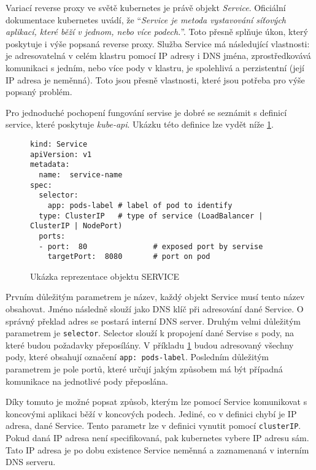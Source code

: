 Variací reverse proxy ve světě kubernetes je právě objekt \textit{Service}. Oficiální dokumentace kubernetes uvádí, že \enquote{\textit{Service je metoda vystavování síťových aplikací, které běží v jednom, nebo více podech.}}\cite{a2023_service}. Toto přesně splňuje úkon, který poskytuje i výše popsaná reverse proxy. Služba Service má následující vlastnosti: je adresovatelná v celém klastru pomocí IP adresy i DNS jména, zprostředkovává komunikaci s jedním, nebo více pody v klastru, je spolehlivá a perzistentní (její IP adresa je neměnná). Toto jsou přesně vlastnosti, které jsou potřeba pro výše popsaný problém.

Pro jednoduché pochopení fungování servise je dobré se seznámit s definicí service, které poskytuje \textit{kube-api}. Ukázku této definice lze vydět níže \ref{fig:def_service}.
\begin{figure}[!htbp]
\caption{Ukázka reprezentace objektu SERVICE}
\label{fig:def_service}
\begin{verbatim}
kind: Service
apiVersion: v1
metadata:
  name:  service-name
spec:
  selector:
    app: pods-label # label of pod to identify 
  type: ClusterIP   # type of service (LoadBalancer | ClusterIP | NodePort)
  ports:
  - port:  80               # exposed port by servise
    targetPort:  8080       # port on pod
\end{verbatim}
\end{figure}

Prvním důležitým parametrem je název, každý objekt Service musí tento název obsahovat. Jméno následně slouží jako DNS klíč při adresování dané Service. O správný překlad adres se postará interní DNS server. Druhým velmi důležitým parametrem je \verb|selector|. Selector slouží k propojení dané Servise s pody, na které budou požadavky přeposílány. V příkladu \ref{fig:def_service} budou adresovaný všechny pody, které obsahují označení \verb|app: pods-label|. Posledním důležitým parametrem je pole portů, které určují jakým způsobem má být případná komunikace na jednotlivé pody přeposlána.

Díky tomuto je možné popsat způsob, kterým lze pomocí Service komunikovat s koncovými aplikaci běží v koncových podech. Jediné, co v definici chybí je IP adresa, dané Service. Tento parametr lze v definici vynutit pomocí \verb|clusterIP|. Pokud daná IP adresa není specifikovaná, pak kubernetes vybere IP adresu sám. Tato IP adresa je po dobu existence Service neměnná a zaznamenaná v interním DNS serveru.  

